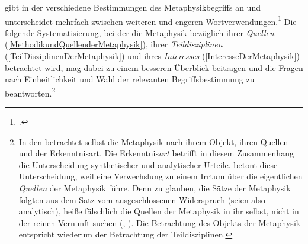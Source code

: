  gibt in der 
verschiedene Bestimmungen des Metaphysikbegriffs an und unterscheidet mehrfach zwischen weiteren und engeren
Wortverwendungen.\footnote{\cite[Vgl.][B
869\,f.,]{Kant:KritikderreinenVernunft2003} \cite[][III:
543.27--544.24]{Kant:GesammelteWerke1900ff.}.} Die folgende Systematisierung,
bei der die Metaphysik bezüglich ihrer \textit{Quellen}
(\ref{MethodikundQuellenderMetaphysik}), ihrer \textit{Teildisziplinen}
(\ref{TeilDisziplinenDerMetaphysik}) und ihres \textit{Interesses}
(\ref{InteresseDerMetaphysik}) betrachtet wird, mag dabei zu einem besseren
Überblick beitragen und die Fragen nach Einheitlichkeit und Wahl der relevanten
Begriffsbestimmung zu beantworten.\footnote{In den 
betrachtet  selbst die Metaphysik nach ihrem Objekt, ihren
Quellen und der Erkenntnisart. Die Erkenntnis\emph{art} betrifft in diesem
Zusammenhang die Unterscheidung synthetischer und analytischer Urteile.
 betont diese Unterscheidung, weil eine Verwechslung zu
einem Irrtum über die eigentlichen \emph{Quellen} der Metaphysik führe. Denn zu
glauben, die Sätze der Metaphysik folgten aus dem Satz vom ausgeschlossenen
Widerspruch (seien also analytisch), heiße fälschlich die Quellen der
Metaphysik in ihr selbst, nicht in der reinen Vernunft suchen
\mkbibparens{\cite[vgl.][\S~3]{Kant:ProlegomenazueinerjedenkuenftigenMetaphysikdiealsWissenschaftwirdauftretenkoennen1977},
\cite[][IV: 270.5--15]{Kant:GesammelteWerke1900ff.}}. Die Betrachtung des
Objekts der Metaphysik entspricht wiederum der Betrachtung der Teildisziplinen.}
